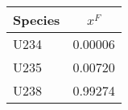 \begin{tabular}{|l||c|}
\hline
\bf{Species} & \bf{$x^F$} \\ 
\hline
U234 & 0.00006 \\ 
\hline
U235 & 0.00720 \\ 
\hline
U238 & 0.99274 \\ 
\hline
\end{tabular}
